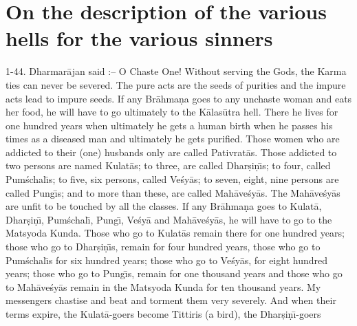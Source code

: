 \chapter{On the description of the various hells for the various sinners}

1-44. Dharmar\=ajan said :-- O Chaste One! Without serving the Gods, the Karma ties can never be severed. The pure acts are the seeds of purities and the impure acts lead to impure seeds. If any Br\=ahma\d{n}a goes to any unchaste woman and eats her food, he will have to go ultimately to the K\=alas\=utra hell. There he lives for one hundred years when ultimately he gets a human birth when he passes his times as a diseased man and ultimately he gets purified. Those women who are addicted to their (one) husbands only are called Pativrat\=as. Those addicted to two persons are named Kulat\=as; to three, are called Dhar\d{s}i\d{n}\={\i}s; to four, called Pum\'schal\={\i}s; to five, six persons, called Ve\'sy\=as; to seven, eight, nine persons are called Pung\={\i}s; and to more than these, are called Mah\=ave\'sy\=as. The Mah\=ave\'sy\=as are unfit to be touched by all the classes. If any Br\=ahma\d{n}a goes to Kulat\=a, Dhar\d{s}i\d{n}\={\i}, Pum\'schal\={\i}, Pung\={\i}, Ve\'sy\=a and Mah\=ave\'sy\=as, he will have to go to the Matsyoda Kunda. Those who go to Kulat\=as remain there for one hundred years; those who go to Dhar\d{s}i\d{n}\={\i}s, remain for four hundred years, those who go to Pum\'schal\={\i}s for six hundred years; those who go to Ve\'sy\=as, for eight hundred years; those who go to Pung\={\i}s, remain for one thousand years and those who go to Mah\=ave\'sy\=as remain in the Matsyoda Kunda for ten thousand years. My messengers chastise and beat and torment them very severely. And when their terms expire, the Kulat\=a-goers become Tittiris (a bird), the Dhar\d{s}i\d{n}\={\i}-goers

